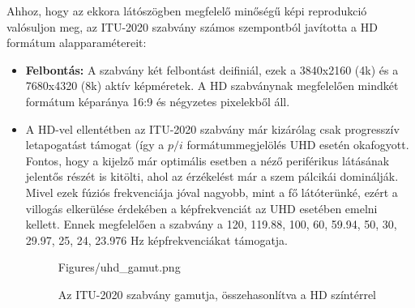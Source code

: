 Ahhoz, hogy az ekkora látószögben megfelelő minőségű képi reprodukció valósuljon meg, az ITU-2020 szabvány számos szempontból javította a HD formátum alapparamétereit:
\begin{itemize}
\item \textbf{Felbontás: } A szabvány két felbontást deifiniál, ezek a 3840x2160 (4k) és a 7680x4320 (8k) aktív képméretek.
A HD szabványnak megfelelően mindkét formátum képaránya 16:9 és négyzetes pixelekből áll.
\item A HD-vel ellentétben az ITU-2020 szabvány már kizárólag csak progresszív letapogatást támogat (így a $p/i$ formátummegjelölés UHD esetén okafogyott.
Fontos, hogy a kijelző már optimális esetben a néző periférikus látásának jelentős részét is kitölti, ahol az érzékelést már a szem pálcikái dominálják.
Mivel ezek fúziós frekvenciája jóval nagyobb, mint a fő látóterünké, ezért a villogás elkerülése érdekében a képfrekvenciát az UHD esetében emelni kellett.
Ennek megfelelően a szabvány a 120, 119.88, 100, 60, 59.94, 50, 30, 29.97, 25, 24, 23.976 Hz képfrekvenciákat támogatja.
\begin{figure}[]
	\centering
	\begin{overpic}[width = 0.75 \columnwidth ]{Figures/uhd_gamut.png}
	\small
	\end{overpic}
	\caption{Az ITU-2020 szabvány gamutja, összehasonlítva a HD színtérrel}
	\label{Fig:UHD_gamut}
\end{figure}


\end{itemize}
